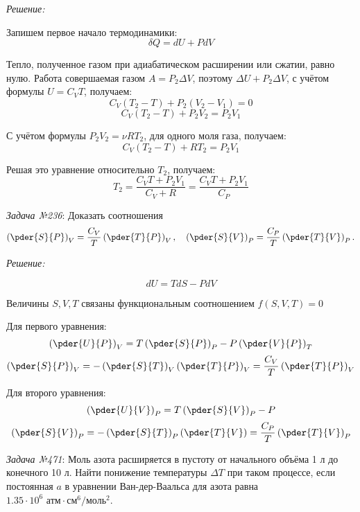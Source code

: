 \documentclass[14pt,final,titlepage,pscyr]{hedsemwork}
\begin{document}
\emph{Решение:}

Запишем первое начало термодинамики:
\[
	\delta Q = dU + PdV
\]

Тепло, полученное газом при адиабатическом расширении или сжатии, равно нулю. 
Работа совершаемая газом \( A = P_2 \Delta V \), поэтому 
\( \Delta U + P_2 \Delta V \), с учётом формулы \( U = C_V T \), получаем:
\[
	C_V( T_2 - T ) + P_2 ( V_2 - V_1 ) = 0
\]
\[
	C_V( T_2 - T ) + P_2 V_2 = P_2 V_1
\]

С учётом формулы \( P_2 V_2 = \nu RT_2 \), для одного моля газа, получаем:
\[
	C_V( T_2 - T ) + RT_2 = P_2 V_1
\]

Решая это уравнение относительно \( T_2 \), получаем:
\[
	T_2 = \frac{C_V T + P_2 V_1}{C_V + R} = \frac{C_V T + P_2 V_1}{C_P}
\]

\newpage
\emph{Задача №236}: Доказать соотношения
\[
    \left( \pder{S}{P} \right)_V = 
        \frac{C_V}{T} \left( \pder{T}{P} \right)_V, \quad
    \left( \pder{S}{V} \right)_P = 
        \frac{C_P}{T} \left( \pder{T}{V} \right)_P.
\]

\emph{Решение:}



\[
	dU = TdS - PdV
\]

Величины \( S, V, T \) связаны функциональным соотношением
\( f(S, V, T) = 0 \)

Для первого уравнения:
\[
	\left( \pder{U}{P} \right)_V = 
		T\left( \pder{S}{P} \right)_P - P\left( \pder{V}{P} \right)_T
\]
\[
	\left( \pder{S}{P} \right)_V = 
		-\left( \pder{S}{T} \right)_V \left( \pder{T}{P} \right)_V = 
		\frac{C_V}{T}\left( \pder{T}{P} \right)_V
\]

Для второго уравнения:
\[
	\left( \pder{U}{V} \right)_P = 
		T\left( \pder{S}{V} \right)_P - P
\]
\[
	\left( \pder{S}{V} \right)_P = 
		-\left( \pder{S}{T} \right)_P \left( \pder{T}{V} \right) = 
		\frac{C_P}{T}\left( \pder{T}{V} \right)_P
\]

\newpage
\emph{Задача №471}: Моль азота расширяется в пустоту от начального объёма 
1 л до конечного 10 л. Найти понижение температуры \( \Delta T \) при 
таком процессе, если постоянная \( a \) в уравнении Ван-дер-Ваальса для 
азота равна \( 1.35\cdot10^6 \text{ атм}\cdot\text{см}^6/\text{моль}^2 \). \\
\end{document}
